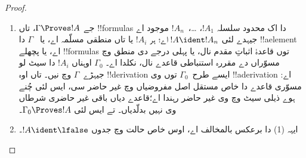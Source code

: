 \documentclass[../../../include/open-logic-section]{subfiles}
\begin{document}
\begin{proof}
  \begin{enumerate}
    \item جے $\Gamma \Proves !A$، تاں !!{formula}s دا اک محدود
      سلسلہ $!A_1$، \dots،~$!A_n$ موجود اے جیہدے لئی
      $!A \ident !A_n$ اے؛ ہر $!A_i$ یا تاں منطقی مسلّمہ اے، یا
      ~$\Gamma$ دا !!a{element} اے، یا پچھلے !!{formula}s توں
      قاعدۂ اثباتِ مقدم نال، یا پہلی درجے دی منطق وچ مسوّراں دے
      مقررہ استنباطی قاعدے نال، نکلدا اے۔ $\Gamma_0$ اوہناں $!A_i$
      دا سیٹ لو جیہڑے~$\Gamma$ وچ نیں۔ تاں اوہ !!{derivation}
      ایسے طرح~$\Gamma_0$ توں وی !!a{derivation} اے: مسوّری قاعدے
      دا خاص مستقل اصل مفروضیاں وچ غیر حاضر سی، ایس لئی چُنے ہوے
      ذیلی سیٹ وچ وی غیر حاضر رہندا اے؛قاعدے دیاں باقی غیر حاضری
      شرطاں وی نہیں بدلّدیاں۔ تے ایس لئی
      $\Gamma_0 \Proves !A$۔
    \item ایہہ (1) دا برعکس بالمخالف اے، اوس خاص حالت وچ جدوں $!A
      \ident \lfalse$۔
\end{enumerate}
\end{proof}
\end{document}
